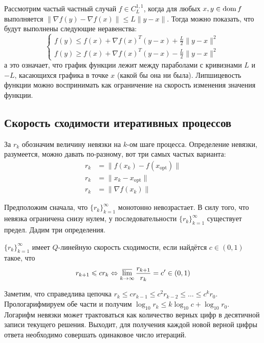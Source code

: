 \documentclass[a4paper, 12pt]{article}
\begin{document}
\begin{enumerate}
    Рассмотрим частый частный случай $f \in C^{1, 1}_{L}$, когда для любых $x, y \in \dom f$ выполняется $\|\nabla f(y) - \nabla f(x)\| \leq L\|y-x\|$. Тогда можно показать, что будут выполнены следующие неравенства:
    \begin{equation*}
        \begin{cases}
        f(y) \leq f(x) + \nabla f(x)^T (y - x) + \frac{L}{2}\|y-x\|^2\\
        f(y) \geq f(x) + \nabla f(x)^T (y - x) - \frac{L}{2}\|y-x\|^2
        \end{cases}
    \end{equation*}
    а это означает, что график функции лежит между параболами с кривизнами $L$ и $-L$, касающихся графика в точке $x$ (какой бы она ни была). Липшицевость функции можно воспринимать как ограничение на скорость изменения значения функции.
    
\end{enumerate}

\subsection{Скорость сходимости итеративных процессов}
За $r_k$ обозначим величину невязки на $k$-ом шаге процесса. Определение невязки, разумеется, можно давать по-разному, вот три самых частых варианта:
\begin{align}
r_k &= \|f(x_k) - f(x_{\text{opt}})\| \\ 
r_k &= \|x_k - x_{\text{opt}}\| \\ 
r_k &= \|\nabla f(x_k)\|
\end{align}


Предположим сначала, что $\{r_k\}_{k=1}^{\infty}$ монотонно невозрастает. В силу того, что невязка ограничена снизу нулем, у последовательности $\{r_k\}_{k=1}^{\infty}$ существует предел. Дадим три определения.

\begin{Def}
    $\{r_k\}_{k=1}^{\infty}$ имеет $Q$-линейную скорость сходимости, если найдётся $c \in (0, 1)$ такое, что
    $$r_{k + 1} \leq cr_k \Leftrightarrow \varlimsup_{k \rightarrow \infty} \frac{r_{k+1}}{r_k} = c' \in (0, 1)$$
\end{Def}

Заметим, что справедлива цепочка $r_k \leq cr_{k-1} \leq c^2r_{k-2} \leq \dots \leq c^kr_0$. Прологарифмируем обе части и получим $\log_{10} r_k \leq k\log_{10} c + \log_{10} r_0$. Логарифм невязки может трактоваться как количество верных цифр в десятичной записи текущего решения. Выходит, для получения каждой новой верной цифры ответа необходимо совершать одинаковое число итераций.
\end{document}
